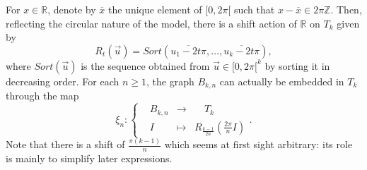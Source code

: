 \documentclass[10pt,11pt]{amsart}%
\begin{document}
For $x\in \mathbb{R}$, denote by $\overline{x}$ the unique element of $[0,2\pi[$ such that $x-\overline{x}\in 2\pi\mathbb{Z}$. Then, reflecting the circular nature of the model, there is a shift action of $\mathbb{R}$ on $T_k$ given by 
$$R_{t}(\vec{u})=Sort(\overline{u_1-2t\pi},\ldots,\overline{u_k-2t\pi}),$$ where $Sort(\vec{u})$ is the sequence obtained from $\vec{u}\in [0,2\pi[^k$ by sorting it in decreasing order. For each $n\geq 1$, the graph $B_{k,n}$ can actually be embedded in $ T_{k}$ through the map
\begin{equation}\label{eq:definition_xi_n}
\xi_n:\left\lbrace \begin{aligned}
&B_{k,n}&\rightarrow &\quad T_{k}\\
&I&\mapsto& R_{\frac{k-1}{2n}} \left(\frac{2\pi }{n}I\right)
\end{aligned}\right..
\end{equation}
 Note that there is a shift of $\frac{\pi(k-1)}{n}$ which seems at first sight arbitrary: its role is mainly to simplify later expressions.
\end{document}
